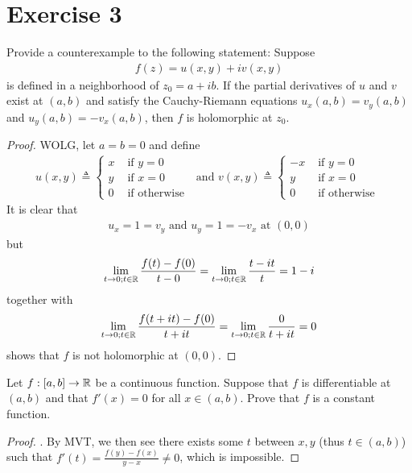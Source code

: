 \documentclass{report}
\begin{document}
\section{Exercise 3}
\begin{question}{}{}
Provide a counterexample to the following statement: Suppose 
\begin{align*}
f(z)=u(x,y)+iv(x,y)
\end{align*}
is defined in a neighborhood of $z_0=a+ib$. If the partial derivatives of  $u$ and $v$ exist at $(a,b)$ and satisfy the Cauchy-Riemann equations $u_x(a,b)=v_y(a,b)$ and $u_y(a,b)=-v_x(a,b)$, then $f$ is holomorphic at $z_0$. 
\end{question}
\begin{proof}
WOLG, let $a=b=0$ and define 
\begin{align*}
u(x,y)\triangleq \begin{cases}
x& \text{ if $y=0$ }\\
y& \text{ if $x=0$ }\\
0& \text{ if otherwise }
\end{cases}\text{ and }v(x,y)\triangleq \begin{cases}
-x& \text{ if $y=0$ }\\
y& \text{ if $x=0$ }\\
0& \text{ if otherwise }
\end{cases}
\end{align*}
It is clear that 
\begin{align*}
u_x=1=v_y\text{ and }u_y=1=-v_x\text{ at }(0,0)
\end{align*}
but
\begin{align*}
\lim_{t\to 0;t\in\mathbb{R}} \frac{f(t)-f(0)}{t-0}= \lim_{t\to 0;t\in\mathbb{R} } \frac{t-it}{t}=1-i
\end{align*}
together with 
\begin{align*}
\lim_{t\to 0;t\in\mathbb{R}} \frac{f(t+it)-f(0)}{t+it}= \lim_{t\to 0;t\in\mathbb{R}}\frac{0}{t+it}=0 
\end{align*}
shows that $f$ is not holomorphic at $(0,0)$.  
\end{proof}
\begin{question}{}{}
Let $f:[a,b]\rightarrow \mathbb{R}$ be a continuous function. Suppose that $f$ is differentiable at $(a,b)$ and that $f'(x)=0$ for all $x\in (a,b)$. Prove that $f$ is a constant function. 
\end{question}
\begin{proof}
. By MVT, we then see there exists some $t$ between  $x,y$  (thus $t\in (a,b)$) such that $f'(t)=\frac{f(y)-f(x)}{y-x}\neq 0$, which is impossible. \CaC 
\end{proof}
\end{document}
